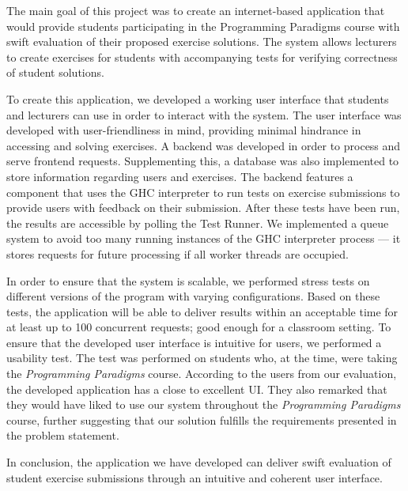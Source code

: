The main goal of this project was to create an internet-based application that would provide students participating in the Programming Paradigms course with swift evaluation of their proposed exercise solutions.
The system allows lecturers to create exercises for students with accompanying tests for verifying correctness of student solutions.

To create this application, we developed a working user interface that students and lecturers can use in order to interact with the system.
The user interface was developed with user-friendliness in mind, providing minimal hindrance in accessing and solving exercises.
A backend was developed in order to process and serve frontend requests.
Supplementing this, a database was also implemented to store information regarding users and exercises.
The backend features a component that uses the GHC interpreter to run tests on exercise submissions to provide users with feedback on their submission.
After these tests have been run, the results are accessible by polling the Test Runner.
We implemented a queue system to avoid too many running instances of the GHC interpreter process --- it stores requests for future processing if all worker threads are occupied.

In order to ensure that the system is scalable, we performed stress tests on different versions of the program with varying configurations.
Based on these tests, the application will be able to deliver results within an acceptable time for at least up to 100 concurrent requests; good enough for a classroom setting.
To ensure that the developed user interface is intuitive for users, we performed a usability test.
The test was performed on students who, at the time, were taking the \textit{Programming Paradigms} course.
According to the users from our evaluation, the developed application has a close to excellent UI.
They also remarked that they would have liked to use our system throughout the \textit{Programming Paradigms} course, further suggesting that our solution fulfills the requirements presented in the problem statement.

In conclusion, the application we have developed can deliver swift evaluation of student exercise submissions through an intuitive and coherent user interface.